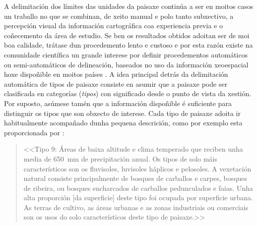 \documentclass[11pt,a4paper]{article}
\begin{document}
A delimitación dos límites das unidades da paisaxe continúa a ser en moitos casos un traballo no que se combinan, de xeito manual e polo tanto subxectivo, a percepción visual da información cartográfica coa experiencia previa e o coñecemento da área de estudio. Se ben os resultados obtidos adoitan ser de moi boa calidade, trátase dun procedemento lento e custoso e por esta razón existe na comunidade científica un grande interese por definir procedementos automáticos ou semi-automáticos de delineación, baseados no uso da información xeoespacial hoxe dispoñible en moitos países \citep{Mucher201087,Jasiewicz2014104}. A idea principal detrás da delimitación automática de tipos de paisaxe consiste en asumir que a paisaxe pode ser clasificada en categorías (\emph{tipos}) con significado desde o punto de vista da xestión. Por suposto, asúmese tamén que a información dispoñible é suficiente para distinguir os tipos que son obxecto de interese. Cada tipo de paisaxe adoita ir habitualmente acompañado dunha pequena descrición, como por exemplo esta proporcionada por \citet{Chuman2010200}:
\begin{quote}
<<Tipo 9: Áreas de baixa altitude e clima temperado que reciben unha media de 650~mm de precipitación anual. Os tipos de solo máis característicos son os fluvisoles, luvisoles háplicos e pelosoles. A vexetación natural consiste principalmente de bosques de carballos e carpes, bosques de ribeira, ou bosques encharcados de carballos pedunculados e faias. Unha alta proporción [da superficie] deste tipo foi ocupada por superficie urbana. As terras de cultivo, as áreas urbanas e as zonas industriais ou comerciais son os usos do solo característicos deste tipo de paisaxe.>>
\end{quote}

\end{document}
